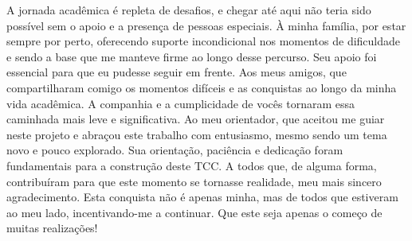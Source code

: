 \begin{agradecimentos}
A jornada acadêmica é repleta de desafios, e chegar até aqui não teria sido possível sem o apoio e a presença de pessoas especiais.
À minha família, por estar sempre por perto, oferecendo suporte incondicional nos momentos de dificuldade e sendo a base que me manteve firme ao longo desse percurso. Seu apoio foi essencial para que eu pudesse seguir em frente.
Aos meus amigos, que compartilharam comigo os momentos difíceis e as conquistas ao longo da minha vida acadêmica. A companhia e a cumplicidade de vocês tornaram essa caminhada mais leve e significativa.
Ao meu orientador, que aceitou me guiar neste projeto e abraçou este trabalho com entusiasmo, mesmo sendo um tema novo e pouco explorado. Sua orientação, paciência e dedicação foram fundamentais para a construção deste TCC.
A todos que, de alguma forma, contribuíram para que este momento se tornasse realidade, meu mais sincero agradecimento. Esta conquista não é apenas minha, mas de todos que estiveram ao meu lado, incentivando-me a continuar. Que este seja apenas o começo de muitas realizações!

\end{agradecimentos}
